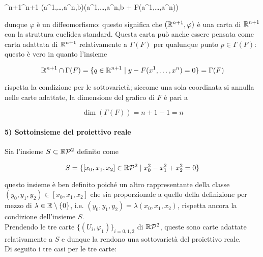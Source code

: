 	{\R^{n+1}}{\R^{n+1}}
	{(a^{1},\dots,a^{n},b)}{(a^{1},\dots,a^{n},b + F(a^{1},\dots,a^{n}))}

dunque $ \varphi $ è un diffeomorfismo: questo significa che $ (\mathbb{R}^{n+1},\varphi) $ è una carta di $ \mathbb{R}^{n+1} $ con la struttura euclidea standard. Questa carta può anche essere pensata come carta adattata di $ \mathbb{R}^{n+1} $ relativamente a $ \Gamma(F) $ per qualunque punto $ p \in \Gamma(F) $: questo è vero in quanto l'insieme

\begin{equation}
	\mathbb{R}^{n+1} \cap \Gamma(F) = \{ q \in \mathbb{R}^{n+1} \mid y - F(x^{1},\dots,x^{n}) = 0 \} = \Gamma(F)
\end{equation}

rispetta la condizione per le sottovarietà; siccome una sola coordinata si annulla nelle carte adattate, la dimensione del grafico di $ F $ è pari a

\begin{equation}
	\dim(\Gamma(F)) = n+1-1 = n
\end{equation}

\paragraph{5) Sottoinsieme del proiettivo reale}

Sia l'insieme $ S \subset \mathbb{R}\mathcal{P}^{2} $ definito come

\begin{equation}
	S = \{ [x_{0},x_{1},x_{2}] \in \mathbb{R}\mathcal{P}^{2} \mid x_{0}^{2} - x_{1}^{2} + x_{2}^{2} = 0 \}
\end{equation}

questo insieme è ben definito poiché un altro rappresentante della classe $ (y_{0},y_{1},y_{2}) \in [x_{0},x_{1},x_{2}] $ che sia proporzionale a quello della definizione per mezzo di $ \lambda \in \mathbb{R} \setminus \{0\} $, i.e. $ (y_{0},y_{1},y_{2}) = \lambda (x_{0},x_{1},x_{2}) $, rispetta ancora la condizione dell'insieme $ S $. \\
Prendendo le tre carte $ \{(U_{i},\varphi_{1})\}_{i=0,1,2} $ di $ \mathbb{R}\mathcal{P}^{2} $, queste sono carte adattate relativamente a $ S $ e dunque la rendono una sottovarietà del proiettivo reale. \\
Di seguito i tre casi per le tre carte:

